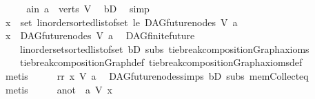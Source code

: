 \begin{isabellebody}
\ \ \isamarkupfalse%
\ \isamarkupfalse%
\ a{\isacharunderscore}{\kern0pt}in{\isacharcolon}{\kern0pt}\ {\isachardoublequoteopen}a\ {\isasymin}\ verts\ V{\isachardoublequoteclose}\ \isamarkupfalse%
\ bD\ \isamarkupfalse%
\ simp\isanewline
\ \ \isamarkupfalse%
\ {\isachardoublequoteopen}x\ {\isasymin}\ set\ {\isacharparenleft}{\kern0pt}linorder{\isachardot}{\kern0pt}sorted{\isacharunderscore}{\kern0pt}list{\isacharunderscore}{\kern0pt}of{\isacharunderscore}{\kern0pt}set\ le\ {\isacharparenleft}{\kern0pt}DAG{\isachardot}{\kern0pt}future{\isacharunderscore}{\kern0pt}nodes\ V\ a{\isacharparenright}{\kern0pt}{\isacharparenright}{\kern0pt}{\isachardoublequoteclose}\isanewline
\ \ \isamarkupfalse%
\ \isamarkupfalse%
\ {\isachardoublequoteopen}x\ {\isasymin}\ DAG{\isachardot}{\kern0pt}future{\isacharunderscore}{\kern0pt}nodes\ V\ a{\isachardoublequoteclose}\ \isamarkupfalse%
\ DAG{\isachardot}{\kern0pt}finite{\isacharunderscore}{\kern0pt}future\isanewline
\ \ \ \ linorder{\isachardot}{\kern0pt}set{\isacharunderscore}{\kern0pt}sorted{\isacharunderscore}{\kern0pt}list{\isacharunderscore}{\kern0pt}of{\isacharunderscore}{\kern0pt}set\ bD\ subs\ tie{\isacharunderscore}{\kern0pt}break{\isacharunderscore}{\kern0pt}compositionGraph{\isacharunderscore}{\kern0pt}axioms\ \isanewline
\ \ \ \ tie{\isacharunderscore}{\kern0pt}break{\isacharunderscore}{\kern0pt}compositionGraph{\isacharunderscore}{\kern0pt}def\ tie{\isacharunderscore}{\kern0pt}break{\isacharunderscore}{\kern0pt}compositionGraph{\isacharunderscore}{\kern0pt}axioms{\isacharunderscore}{\kern0pt}def\isanewline
\ \ \ \ \isamarkupfalse%
\ metis\isanewline
\ \ \isamarkupfalse%
\ \isamarkupfalse%
\ rr{\isacharcolon}{\kern0pt}\ {\isachardoublequoteopen}x\ {\isasymrightarrow}\isactrlsup {\isacharplus}{\kern0pt}\isactrlbsub V\isactrlesub \ a{\isachardoublequoteclose}\ \isamarkupfalse%
\ DAG{\isachardot}{\kern0pt}future{\isacharunderscore}{\kern0pt}nodes{\isachardot}{\kern0pt}simps\ bD\ subs\ mem{\isacharunderscore}{\kern0pt}Collect{\isacharunderscore}{\kern0pt}eq\isanewline
\ \ \ \ \isamarkupfalse%
\ metis\isanewline
\ \ \isamarkupfalse%
\ \isamarkupfalse%
\ a{\isacharunderscore}{\kern0pt}not{\isacharcolon}{\kern0pt}\ {\isachardoublequoteopen}{\isasymnot}\ a\ {\isasymrightarrow}\isactrlsup {\isacharasterisk}{\kern0pt}\isactrlbsub V\isactrlesub \ x{\isachardoublequoteclose}\ \isamarkupfalse%

\end{isabellebody}
